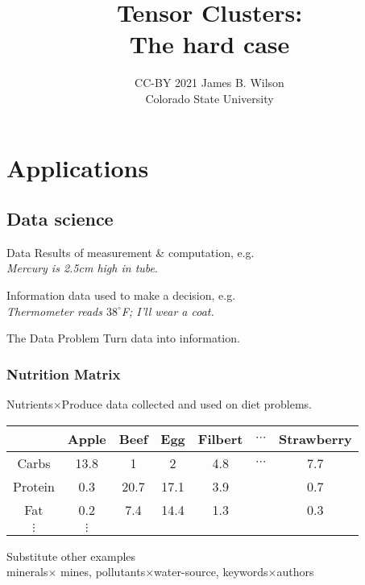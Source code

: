 \documentclass{beamer}
\begin{document}
\title{Tensor Clusters:\\The hard case}
\author{CC-BY 2021 James B. Wilson\\ Colorado State University}

\maketitle

\section{Applications}

\subsection{Data science}
\begin{frame} 
    \begin{block}{Data}
        Results of measurement \& computation, e.g.\\[5pt]
        \centering
        \emph{Mercury is 2.5cm high in tube}.
    \end{block}

    \begin{block}{Information}
        data used to make a decision, e.g.\\[5pt]
        \centering
        \emph{Thermometer reads $38^{\circ}$F; I'll wear a coat.} 
    \end{block}
    

    \begin{block}{The Data Problem}
        Turn data into information.
    \end{block}

\end{frame}


\begin{frame}
    \frametitle{Nutrition Matrix}
    Nutrients$\times$Produce data collected and used on diet problems.
    \bigskip 

    \begin{tabular}{c|cccccc|}
             & Apple & Beef & Egg & Filbert & $\cdots$ & Strawberry \\
    \hline
    Carbs    & 13.8  & 1    & 2    & 4.8    & $\cdots$  & 7.7 \\
    Protein  & 0.3   & 20.7 & 17.1 & 3.9    &  & 0.7 \\
    Fat      & 0.2   & 7.4  & 14.4 & 1.3    &  & 0.3 \\
    $\vdots $ & $\vdots$ & & & & &\\
    \hline 
    \end{tabular} 

    \bigskip
    Substitute other examples\\
     minerals$\times$ mines, pollutants$\times$water-source, 
    keywords$\times$authors
\end{frame}
\end{document}
